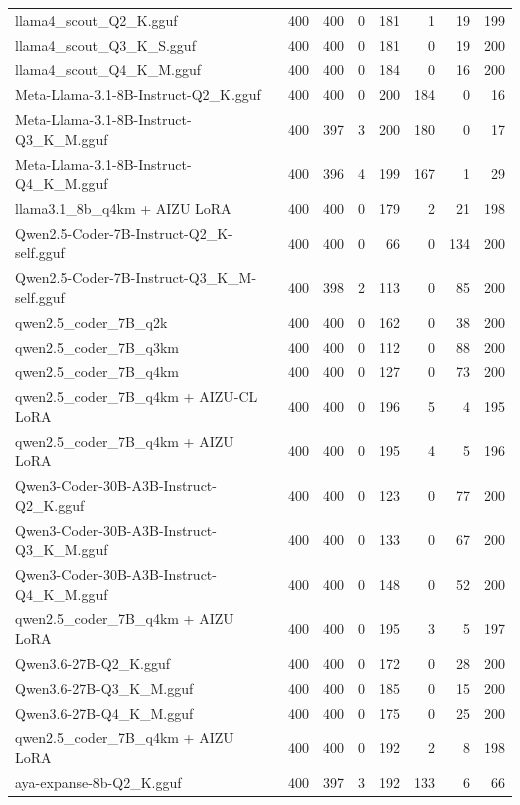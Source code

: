 \begin{table}[htbp]
{\begin{tabular}{lrrrrrrr}
    llama4\_scout\_Q2\_K.gguf & 400 & 400 & 0 & 181 & 1 & 19 & 199 \\
    llama4\_scout\_Q3\_K\_S.gguf & 400 & 400 & 0 & 181 & 0 & 19 & 200 \\
    llama4\_scout\_Q4\_K\_M.gguf & 400 & 400 & 0 & 184 & 0 & 16 & 200 \\
    Meta-Llama-3.1-8B-Instruct-Q2\_K.gguf & 400 & 400 & 0 & 200 & 184 & 0 & 16 \\
    Meta-Llama-3.1-8B-Instruct-Q3\_K\_M.gguf & 400 & 397 & 3 & 200 & 180 & 0 & 17 \\
    Meta-Llama-3.1-8B-Instruct-Q4\_K\_M.gguf & 400 & 396 & 4 & 199 & 167 & 1 & 29 \\
    llama3.1\_8b\_q4km + AIZU LoRA & 400 & 400 & 0 & 179 & 2 & 21 & 198 \\
    Qwen2.5-Coder-7B-Instruct-Q2\_K-self.gguf & 400 & 400 & 0 & 66 & 0 & 134 & 200 \\
    Qwen2.5-Coder-7B-Instruct-Q3\_K\_M-self.gguf & 400 & 398 & 2 & 113 & 0 & 85 & 200 \\
    qwen2.5\_coder\_7B\_q2k & 400 & 400 & 0 & 162 & 0 & 38 & 200 \\
    qwen2.5\_coder\_7B\_q3km & 400 & 400 & 0 & 112 & 0 & 88 & 200 \\
    qwen2.5\_coder\_7B\_q4km & 400 & 400 & 0 & 127 & 0 & 73 & 200 \\
    qwen2.5\_coder\_7B\_q4km + AIZU-CL LoRA & 400 & 400 & 0 & 196 & 5 & 4 & 195 \\
    qwen2.5\_coder\_7B\_q4km + AIZU LoRA & 400 & 400 & 0 & 195 & 4 & 5 & 196 \\
    Qwen3-Coder-30B-A3B-Instruct-Q2\_K.gguf & 400 & 400 & 0 & 123 & 0 & 77 & 200 \\
    Qwen3-Coder-30B-A3B-Instruct-Q3\_K\_M.gguf & 400 & 400 & 0 & 133 & 0 & 67 & 200 \\
    Qwen3-Coder-30B-A3B-Instruct-Q4\_K\_M.gguf & 400 & 400 & 0 & 148 & 0 & 52 & 200 \\
    qwen2.5\_coder\_7B\_q4km + AIZU LoRA & 400 & 400 & 0 & 195 & 3 & 5 & 197 \\
    Qwen3.6-27B-Q2\_K.gguf & 400 & 400 & 0 & 172 & 0 & 28 & 200 \\
    Qwen3.6-27B-Q3\_K\_M.gguf & 400 & 400 & 0 & 185 & 0 & 15 & 200 \\
    Qwen3.6-27B-Q4\_K\_M.gguf & 400 & 400 & 0 & 175 & 0 & 25 & 200 \\
    qwen2.5\_coder\_7B\_q4km + AIZU LoRA & 400 & 400 & 0 & 192 & 2 & 8 & 198 \\
    aya-expanse-8b-Q2\_K.gguf & 400 & 397 & 3 & 192 & 133 & 6 & 66 \\

\end{tabular}}
\end{table}
